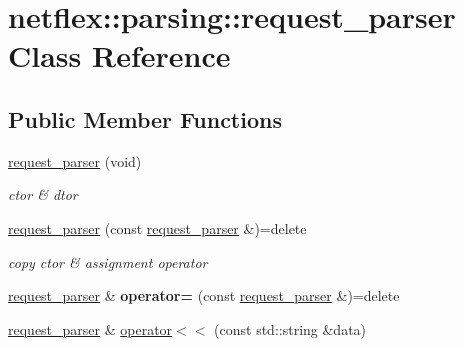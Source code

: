 \hypertarget{classnetflex_1_1parsing_1_1request__parser}{}\section{netflex\+:\+:parsing\+:\+:request\+\_\+parser Class Reference}
\label{classnetflex_1_1parsing_1_1request__parser}
\subsection*{Public Member Functions}
\begin{DoxyCompactItemize}
\item 
\mbox{\label{classnetflex_1_1parsing_1_1request__parser_a7ab3962c03f01b2be6459adec8d502be}} 
\hyperlink{classnetflex_1_1parsing_1_1request__parser_a7ab3962c03f01b2be6459adec8d502be}{request\+\_\+parser} (void)
\begin{DoxyCompactList}\small\item\em ctor \& dtor \end{DoxyCompactList}\item 
\mbox{\label{classnetflex_1_1parsing_1_1request__parser_aa47a7676d5e2da63d2d0e5be9bc3d483}} 
\hyperlink{classnetflex_1_1parsing_1_1request__parser_aa47a7676d5e2da63d2d0e5be9bc3d483}{request\+\_\+parser} (const \hyperlink{classnetflex_1_1parsing_1_1request__parser}{request\+\_\+parser} \&)=delete
\begin{DoxyCompactList}\small\item\em copy ctor \& assignment operator \end{DoxyCompactList}\item 
\mbox{\label{classnetflex_1_1parsing_1_1request__parser_ae767b927e82531e4cd8b1581cf9c391b}} 
\hyperlink{classnetflex_1_1parsing_1_1request__parser}{request\+\_\+parser} \& {\bfseries operator=} (const \hyperlink{classnetflex_1_1parsing_1_1request__parser}{request\+\_\+parser} \&)=delete
\item 
\mbox{\label{classnetflex_1_1parsing_1_1request__parser_a812651cbfdbff54e025fe131563de818}} 
\hyperlink{classnetflex_1_1parsing_1_1request__parser}{request\+\_\+parser} \& \hyperlink{classnetflex_1_1parsing_1_1request__parser_a812651cbfdbff54e025fe131563de818}{operator$<$$<$} (const std\+::string \&data)

\end{DoxyCompactItemize}
